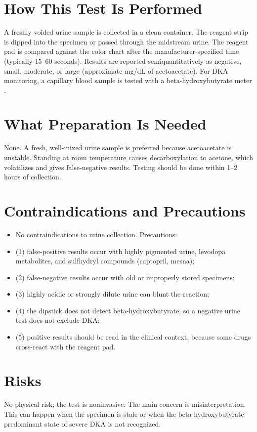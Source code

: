 \section*{How This Test Is Performed}
A freshly voided urine sample is collected in a clean container. The reagent strip is dipped into the specimen or passed through the midstream urine. The reagent pad is compared against the color chart after the manufacturer-specified time (typically 15--60 seconds). Results are reported semiquantitatively as negative, small, moderate, or large (approximate mg/dL of acetoacetate). For DKA monitoring, a capillary blood sample is tested with a beta-hydroxybutyrate meter \cite{tietz2023textbook}.
\section*{What Preparation Is Needed}
None. A fresh, well-mixed urine sample is preferred because acetoacetate is unstable. Standing at room temperature causes decarboxylation to acetone, which volatilizes and gives false-negative results. Testing should be done within 1--2 hours of collection.
\section*{Contraindications and Precautions}
\begin{itemize}
  \item No contraindications to urine collection. Precautions:
  \item (1) false-positive results occur with highly pigmented urine, levodopa metabolites, and sulfhydryl compounds (captopril, mesna);
  \item (2) false-negative results occur with old or improperly stored specimens;
  \item (3) highly acidic or strongly dilute urine can blunt the reaction;
  \item (4) the dipstick does not detect beta-hydroxybutyrate, so a negative urine test does not exclude DKA;
  \item (5) positive results should be read in the clinical context, because some drugs cross-react with the reagent pad.
\end{itemize}
\section*{Risks}
No physical risk; the test is noninvasive. The main concern is misinterpretation. This can happen when the specimen is stale or when the beta-hydroxybutyrate-predominant state of severe DKA is not recognized.
